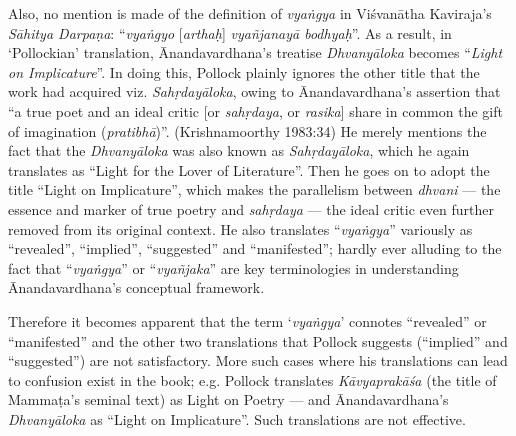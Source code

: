 Also, no mention is made of the definition of \textsl{vyaṅgya} in Viśvanātha Kaviraja’s \textsl{Sāhitya Darpaṇa}: “\textsl{vyaṅgyo} [\textsl{arthaḥ}] \textsl{vyañjanayā bodhyaḥ}”. As a result, in ‘Pollockian’ translation, Ānandavardhana’s treatise \textsl{Dhvanyāloka} becomes “\textsl{Light on Implicature}”. In doing this, Pollock plainly ignores the other title that the work had acquired viz. \textsl{Sahṛdayāloka}, owing to Ānandavardhana’s assertion that “a true poet and an ideal critic [or \textsl{sahṛdaya}, or \textsl{rasika}] share in common the gift of imagination (\textsl{pratibhā})”. (Krishnamoorthy 1983:34) He merely mentions the fact that the \textsl{Dhvanyāloka} was also known as \textsl{Sahṛdayāloka}, which he again translates as “Light for the Lover of Literature”. Then he goes on to adopt the title “Light on Implicature”, which makes the parallelism between \textsl{dhvani} --- the essence and marker of true poetry and \textsl{sahṛdaya} --- the ideal critic even further removed from its original context. He also translates “\textsl{vyaṅgya}” variously as “revealed”, “implied”, “suggested” and “manifested”; hardly ever alluding to the fact that “\textsl{vyaṅgya}” or “\textsl{vyañjaka}” are key terminologies in understanding Ānandavardhana’s conceptual framework.

Therefore it becomes apparent that the term ‘\textsl{vyaṅgya}’ connotes “revealed” or “manifested” and the other two translations that Pollock suggests (“implied” and “suggested”) are not satisfactory. More such cases where his translations can lead to confusion exist in the book; e.g. Pollock translates \textsl{Kāvyaprakāśa} (the title of Mammaṭa’s seminal text) as Light on Poetry --- and Ānandavardhana’s \textsl{Dhvanyāloka} as “Light on Implicature”. Such translations are not effective.

